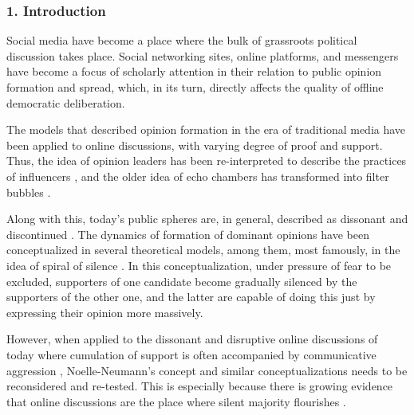 \subsubsection{1. Introduction}

Social media have become a place where the bulk of grassroots political discussion takes place. Social networking sites, online platforms, and messengers have become a focus of scholarly attention in their relation to public opinion formation and spread, which, in its turn, directly affects the quality of offline democratic deliberation.

The models that described opinion formation in the era of traditional media have been applied to online discussions, with varying degree of proof and support. Thus, the idea of opinion leaders \cite{KatzLazarsfeld} has been re-interpreted to describe the practices of influencers \cite{Gillin,BakshyHofmanMason,BodrunovaLitvinenkoBlekanov2017}, and the older idea of echo chambers \cite{Key} has transformed into filter bubbles \cite{Bruns2019}.

Along with this, today’s public spheres are, in general, described as dissonant \cite{Pfetsch} and discontinued \cite{SmoliarovaBodrunovaBlekanov2020}. The dynamics of formation of dominant opinions have been conceptualized in several theoretical models, among them, most famously, in the idea of spiral of silence \cite{NoelleNeuman1974}. In this conceptualization, under pressure of fear to be excluded, supporters of one candidate become gradually silenced by the supporters of the other one, and the latter are capable of doing this just by expressing their opinion more massively.

However, when applied to the dissonant and disruptive online discussions of today where cumulation of support is often accompanied by communicative aggression \cite{Sidorov,BodrunovaLitvinenkoBlekanov2021}, Noelle-Neumann’s concept and similar conceptualizations needs to be reconsidered and re-tested. This is especially because there is growing evidence that online discussions are the place where silent majority flourishes \cite{MustafarajFinnWhitlock,ChenLiYao,McKeeverMcKeeverHolton,MaiShanBai}.

